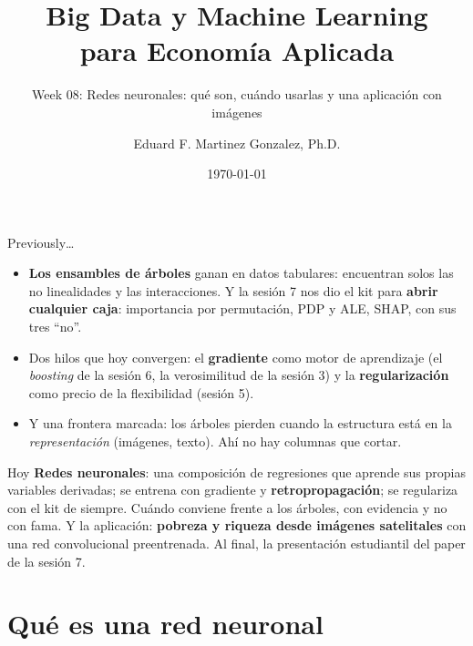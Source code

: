 \documentclass{beamer}
\title[BDML]{Big Data y Machine Learning \\ para Economía Aplicada}
\subtitle{Week 08: Redes neuronales: qué son, cuándo usarlas y una aplicación con imágenes}
\author{Eduard F. Martinez Gonzalez, Ph.D.}
\institute[]{Departamento de Economía, Universidad Icesi}
\date{\today}
\newcommand{\1}{\mathbb{I}}
\begin{document}
\begin{frame}
\titlepage
\end{frame}

\begin{frame}{Previously\ldots}
\small
\begin{itemize}\itemsep4pt
  \item \textbf{Los ensambles de árboles} ganan en datos tabulares: encuentran solos las no linealidades y las interacciones. Y la sesión 7 nos dio el kit para \textbf{abrir cualquier caja}: importancia por permutación, PDP y ALE, SHAP, con sus tres ``no''. \pause
  \item Dos hilos que hoy convergen: el \textbf{gradiente} como motor de aprendizaje (el \emph{boosting} de la sesión 6, la verosimilitud de la sesión 3) y la \textbf{regularización} como precio de la flexibilidad (sesión 5). \pause
  \item Y una frontera marcada: los árboles pierden cuando la estructura está en la \emph{representación} (imágenes, texto). Ahí no hay columnas que cortar.
\end{itemize}
\pause
\begin{block}{Hoy}
\textbf{Redes neuronales}: una composición de regresiones que aprende sus propias variables derivadas; se entrena con gradiente y \textbf{retropropagación}; se regulariza con el kit de siempre. Cuándo conviene frente a los árboles, con evidencia y no con fama. Y la aplicación: \textbf{pobreza y riqueza desde imágenes satelitales} con una red convolucional preentrenada. Al final, la presentación estudiantil del paper de la sesión 7.
\end{block}
\end{frame}


\section{Qué es una red neuronal}
\begin{frame}[noframenumbering]
\tableofcontents[currentsection]
\end{frame}
\end{document}
